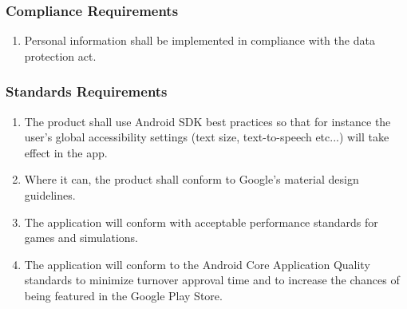 \documentclass[]{article}
\begin{document}
\subsubsection{Compliance Requirements}
\label{ssub:compliance_requirements}
\begin{enumerate}[{LR}1. ]
	\item Personal information shall be implemented in compliance with the data protection act.
	\holdEnum
\end{enumerate}

\subsubsection{Standards Requirements}
\label{ssub:standards_requirements}
\begin{enumerate}[{LR}1. ]
	\resumeEnum
	\item The product shall use Android SDK best practices so that for instance the user's global accessibility settings (text size, text-to-speech etc...) will take effect in the app.
	\item Where it can, the product shall conform to Google's material design guidelines.
	\item The application will conform with acceptable performance standards for games and simulations.
	\item The application will conform to the Android Core Application Quality standards to minimize turnover approval time and to increase the chances of being featured in the Google Play Store.
\end{enumerate}


\newpage
\appendix
\end{document}
